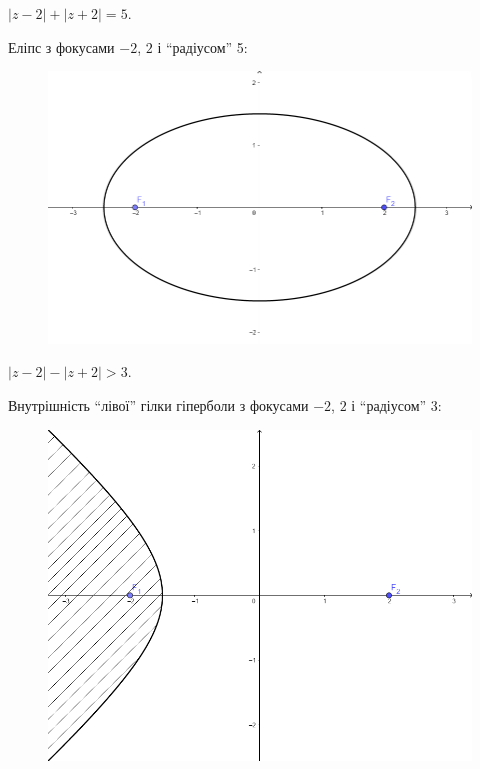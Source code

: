 \begin{problem}
	$|z - 2| + |z + 2| = 5$.
\end{problem}
\begin{solution}
	Еліпс з фокусами $-2$, $2$ і ``радіусом'' 5:
	\begin{figure}[H]
		\centering
		\includegraphics[width=\linewidth]{fig-7.png}
	\end{figure}
\end{solution}

\begin{problem}
	$|z-2| - |z+2| > 3$.
\end{problem}
\begin{solution}
	Внутрішність ``лівої'' гілки гіперболи з фокусами $-2$, $2$ і ``радіусом'' 3:
	\begin{figure}[H]
		\centering
		\includegraphics[width=.85\linewidth]{fig-8.png}
	\end{figure}
\end{solution}

